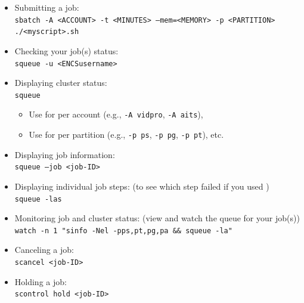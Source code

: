 \begin{itemize}
	\item Submitting a job:\\
	\texttt{sbatch -A <ACCOUNT> -t <MINUTES> --mem=<MEMORY> -p <PARTITION> ./<myscript>.sh}

	\item Checking your job(s) status:\\
	\texttt{squeue -u <ENCSusername>}

	\item Displaying cluster status:\\
	\texttt{squeue}
		\begin{itemize}
			\item Use  for per account (e.g., \texttt{-A vidpro}, \texttt{-A aits}), 
			\item Use  for per partition (e.g., \texttt{-p ps}, \texttt{-p pg}, \texttt{-p pt}), etc.
		\end{itemize}

	\item Displaying job information:\\
	\texttt{squeue --job <job-ID>}

	\item Displaying individual job steps: (to see which step failed if you used )\\
	\texttt{squeue -las}

	\item Monitoring job and cluster status: (view  and watch the queue for your job(s))\\
	\verb+watch -n 1 "sinfo -Nel -pps,pt,pg,pa && squeue -la"+

	\item Canceling a job:\\
	\texttt{scancel <job-ID>}

	\item Holding a job:\\
	\texttt{scontrol hold <job-ID>}


\end{itemize}
